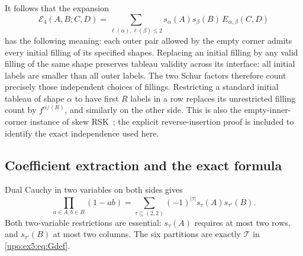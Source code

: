 \documentclass[11pt,letterpaper]{article}
\theoremstyle{remark}\newtheorem{remark}[theorem]{Remark}
\numberwithin{equation}{section}
\newcommand{\Tset}{\mathcal T}
\begin{document}
It follows that the expansion
\begin{equation}\label{upo:ex5:eq:saturation}
 \mathcal E_4(A,B;C,D)
  =\sum_{\ell(\alpha),\ell(\beta)\le2}
       s_\alpha(A)s_\beta(B)\,
       E_{\alpha,\beta}(C,D)
\end{equation}
has the following meaning: each outer pair allowed by the empty
corner admits every initial filling of its specified shapes.
Replacing an initial filling by any valid filling of the same shape
preserves tableau validity across its interface: all initial labels
are smaller than all outer labels. The two Schur factors therefore
count precisely those independent choices of fillings. Restricting a standard initial tableau of shape $\alpha$
to have first $R$ labels in a row replaces its unrestricted filling
count by $f^{\alpha/(R)}$, and similarly on the other side. This is
also the empty-inner-corner instance of skew RSK~\cite{SS}; the
explicit reverse-insertion proof is included to identify the exact
independence used here.

\subsection{Coefficient extraction and the exact formula}
Dual Cauchy in two variables on both sides gives
\begin{equation}\label{upo:ex5:eq:dualcauchy}
 \prod_{a\in A,b\in B}(1-ab)
   =\sum_{\tau\subseteq(2,2)}(-1)^{|\tau|}
         s_\tau(A)s_{\tau'}(B).
\end{equation}
Both two-variable restrictions are essential: $s_\tau(A)$ requires
at most two rows, and $s_{\tau'}(B)$ at most two columns. The six
partitions are exactly $\Tset$ in \eqref{upo:ex5:eq:Gdef}.
\end{document}
